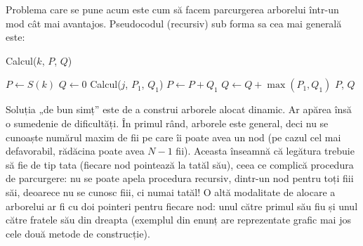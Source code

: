 Problema care se pune acum este cum să facem parcurgerea arborelui într-un mod
cât mai avantajos. Pseudocodul (recursiv) sub forma sa cea mai generală este:

\vspace{\algskip}
\begin{algorithm}
  \caption{Calcul($k$, $P$, $Q$)}
  \begin{algorithmic}[1]
    \STATE $P \leftarrow S(k)$
    \STATE $Q \leftarrow 0$
    \STATE Calcul($j$, $P_1$, $Q_1$)
    \STATE $P \leftarrow P + Q_1$
    \STATE $Q \leftarrow Q + \max(P_1, Q_1)$
    \ENDFOR
    \RETURN $P$, $Q$
  \end{algorithmic}
\end{algorithm}

Soluția „de bun simț” este de a construi arborele alocat dinamic. Ar apărea
însă o sumedenie de dificultăți. În primul rând, arborele este general, deci
nu se cunoaște numărul maxim de fii pe care îi poate avea un nod (pe cazul cel
mai defavorabil, rădăcina poate avea $N-1$ fii). Aceasta înseamnă că legătura
trebuie să fie de tip tata (fiecare nod pointează la tatăl său), ceea ce
complică procedura de parcurgere: nu se poate apela procedura recursiv,
dintr-un nod pentru toți fiii săi, deoarece nu se cunosc fiii, ci numai tatăl!
O altă modalitate de alocare a arborelui ar fi cu doi pointeri pentru fiecare
nod: unul către primul său fiu și unul către fratele său din dreapta (exemplul
din enunț are reprezentate grafic mai jos cele două metode de construcție).


